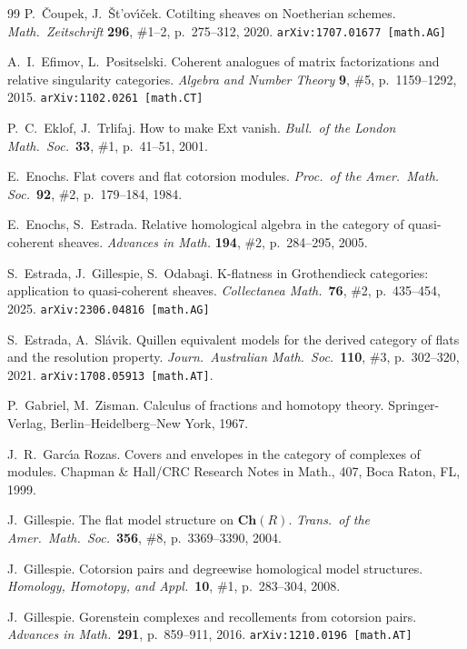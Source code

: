 \documentclass[12pt,a4paper]{amsart}
\newcommand{\+}{\nobreakdash-}
\renewcommand{\:}{\colon}
\theoremstyle{plain}
\theoremstyle{definition}
\begin{document}
\begin{thebibliography}{99}
 P.~\v Coupek, J.~\v St\!'ov\'\i\v cek.
   Cotilting sheaves on Noetherian schemes.
\textit{Math.\ Zeitschrift} \textbf{296}, \#1--2, p.~275--312, 2020.
\texttt{arXiv:1707.01677 [math.AG]}

 A.~I.~Efimov, L.~Positselski.
   Coherent analogues of matrix factorizations and relative
singularity categories.
\textit{Algebra and Number Theory} \textbf{9}, \#5, p.~1159--1292,
2015.  \texttt{arXiv:1102.0261 [math.CT]}

 P.~C.~Eklof, J.~Trlifaj.
   How to make Ext vanish.
\textit{Bull.\ of the London Math.\ Soc.}\ \textbf{33}, \#1,
p.~41--51, 2001.

 E.~Enochs.
   Flat covers and flat cotorsion modules.
\textit{Proc.\ of the Amer.\ Math. Soc.}\ \textbf{92}, \#2,
p.~179--184, 1984.

 E.~Enochs, S.~Estrada.
   Relative homological algebra in the category of quasi-coherent
sheaves.
\textit{Advances in Math.} \textbf{194}, \#2, p.~284--295, 2005.

 S.~Estrada, J.~Gillespie, S.~Odaba\c si.
   K\+flatness in Grothendieck categories: application to
quasi-coherent sheaves.
\textit{Collectanea Math.}\ \textbf{76}, \#2, p.~435--454, 2025.
\texttt{arXiv:2306.04816 [math.AG]}

 S.~Estrada, A.~Sl\'avik.
   Quillen equivalent models for the derived category of flats
and the resolution property.
\textit{Journ.\ Australian Math.\ Soc.}\ \textbf{110}, \#3,
p.~302--320, 2021.  \texttt{arXiv:1708.05913 [math.AT]}.

 P.~Gabriel, M.~Zisman.
   Calculus of fractions and homotopy theory.
Springer-Verlag, Berlin--Heidelberg--New York, 1967.

 J.~R.~Garc\'\i a Rozas.
   Covers and envelopes in the category of complexes of modules.
Chapman \& Hall/CRC Research Notes in Math., 407, Boca Raton, FL, 1999.

 J.~Gillespie.
   The flat model structure on $\mathbf{Ch}(R)$.
\textit{Trans.\ of the Amer.\ Math.\ Soc.}\ \textbf{356}, \#8,
p.~3369--3390, 2004.

 J.~Gillespie.
   Cotorsion pairs and degreewise homological model structures.
\textit{Homology, Homotopy, and Appl.}\ \textbf{10}, \#1,
p.~283--304, 2008.

 J.~Gillespie.
   Gorenstein complexes and recollements from cotorsion pairs.
\textit{Advances in Math.}\ \textbf{291}, p.~859--911, 2016.
\texttt{arXiv:1210.0196 [math.AT]}


\end{thebibliography}
\end{document}
